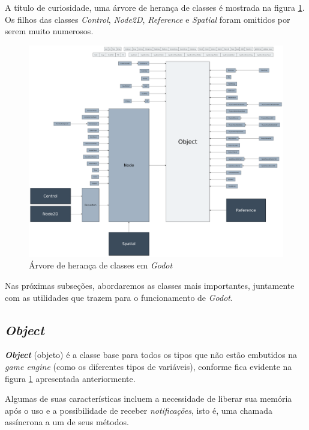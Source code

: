 A título de curiosidade, uma árvore de herança de classes é mostrada na figura \ref{godotClasses}. Os filhos das classes \textit{Control}, \textit{Node2D}, \textit{Reference} e \textit{Spatial} foram omitidos por serem muito numerosos.

\begin{figure}[H]
  \centering
  \includegraphics[width=\textwidth]{image/godot-classes.png}
  \caption{Árvore de herança de classes em \textit{Godot} \citep{godotClasses}}
  \label{godotClasses}
\end{figure}

Nas próximas subseções, abordaremos as classes mais importantes, juntamente com as utilidades que trazem para o funcionamento de \textit{Godot}.


\subsection{\textit{Object}}
\label{godotObject}

\textbf{\textit{Object}} (objeto) é a classe base para todos os tipos que não estão embutidos na \textit{game engine} (como os diferentes tipos de variáveis), conforme fica evidente na figura \ref{godotClasses} apresentada anteriormente.

Algumas de suas características incluem a necessidade de liberar sua memória após o uso e a possibilidade de receber \emph{notificações}, isto é, uma chamada assíncrona a um de seus métodos.

